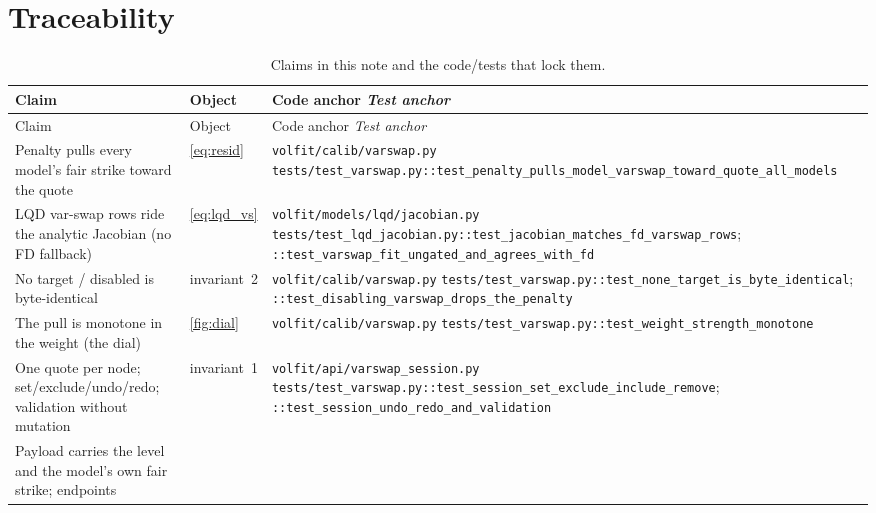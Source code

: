 \documentclass[11pt]{article}
\begin{document}
\section{Traceability}
\label{app:trace}

\begingroup
\small
\setlength{\tabcolsep}{4pt}
\renewcommand{\arraystretch}{1.15}
\begin{longtable}{@{}p{}p{}p{}@{}}
\caption{Claims in this note and the code/tests that lock them.}
\label{tab:trace}\\
\toprule Claim & Object & Code anchor \newline \emph{Test anchor}\\ \midrule
\endfirsthead
\toprule Claim & Object & Code anchor \newline \emph{Test anchor}\\ \midrule
\endhead
Penalty pulls every model's fair strike toward the quote &
\eqref{eq:resid} &
\nolinkurl{volfit/calib/varswap.py}\newline
\nolinkurl{tests/test_varswap.py::test_penalty_pulls_model_varswap_toward_quote_all_models}\\
\addlinespace
LQD var-swap rows ride the analytic Jacobian (no FD fallback) &
\eqref{eq:lqd_vs} &
\nolinkurl{volfit/models/lqd/jacobian.py}\newline
\nolinkurl{tests/test_lqd_jacobian.py::test_jacobian_matches_fd_varswap_rows};
\nolinkurl{::test_varswap_fit_ungated_and_agrees_with_fd}\\
\addlinespace
No target / disabled is byte-identical &
invariant~2 &
\nolinkurl{volfit/calib/varswap.py}\newline
\nolinkurl{tests/test_varswap.py::test_none_target_is_byte_identical};
\nolinkurl{::test_disabling_varswap_drops_the_penalty}\\
\addlinespace
The pull is monotone in the weight (the dial) &
\cref{fig:dial} &
\nolinkurl{volfit/calib/varswap.py}\newline
\nolinkurl{tests/test_varswap.py::test_weight_strength_monotone}\\
\addlinespace
One quote per node; set/exclude/undo/redo; validation without mutation &
invariant~1 &
\nolinkurl{volfit/api/varswap_session.py}\newline
\nolinkurl{tests/test_varswap.py::test_session_set_exclude_include_remove};
\nolinkurl{::test_session_undo_redo_and_validation}\\
\addlinespace
Payload carries the level and the model's own fair strike; endpoints

\end{longtable}
\end{document}
